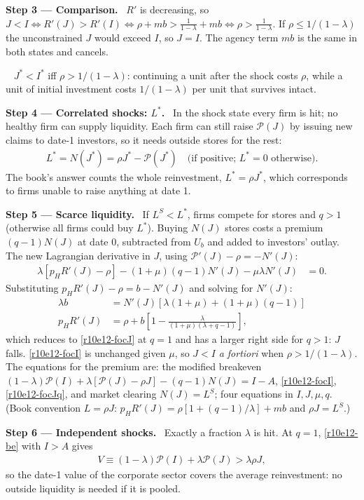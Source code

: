 \documentclass[11pt,a4paper]{article}
\newcommand{\step}[2]{\par\medskip\noindent\textbf{Step #1 --- #2.}~}
\newcommand{\answer}[1]{\par\smallskip\noindent\fbox{\textbf{Answer\if\relax\detokenize{#1}\relax\else\ #1\fi.}}~}
\newcommand{\Pc}{\mathcal{P}}
\begin{document}
\step{3}{Comparison} $R'$ is decreasing, so $J<I\iff R'(J)>R'(I)\iff\rho+mb>\frac1{1-\lambda}+mb\iff\rho>\frac1{1-\lambda}$. If $\rho\leq1/(1-\lambda)$ the unconstrained $J$ would exceed $I$, so $J=I$. The agency term $mb$ is the same in both states and cancels.

\answer{(i)} $J^*<I^*$ iff $\rho>1/(1-\lambda)$: continuing a unit after the shock costs $\rho$, while a unit of initial investment costs $1/(1-\lambda)$ per unit that survives intact.

\step{4}{Correlated shocks: $L^*$} In the shock state every firm is hit; no healthy firm can supply liquidity. Each firm can still raise $\Pc(J)$ by issuing new claims to date-1 investors, so it needs outside stores for the rest:
\begin{align}
  L^* = N(J^*) = \rho J^*-\Pc(J^*) \quad\text{(if positive; } L^*=0 \text{ otherwise)}. \label{r10e12-L}
\end{align}
The book's answer counts the whole reinvestment, $L^*=\rho J^*$, which corresponds to firms unable to raise anything at date 1.

\step{5}{Scarce liquidity} If $L^S<L^*$, firms compete for stores and $q>1$ (otherwise all firms could buy $L^*$). Buying $N(J)$ stores costs a premium $(q-1)N(J)$ at date 0, subtracted from $U_b$ and added to investors' outlay. The new Lagrangian derivative in $J$, using $\Pc'(J)-\rho=-N'(J)$:
\begin{align}
  \lambda[p_HR'(J)-\rho]-(1+\mu)(q-1)N'(J)-\mu\lambda N'(J) &= 0. \nonumber
\end{align}
Substituting $p_HR'(J)-\rho=b-N'(J)$ and solving for $N'(J)$:
\begin{align}
  \lambda b &= N'(J)[\lambda(1+\mu)+(1+\mu)(q-1)] \nonumber\\
  p_HR'(J) &= \rho+b\left[1-\frac{\lambda}{(1+\mu)(\lambda+q-1)}\right], \tag{4$''$}\label{r10e12-focJq}
\end{align}
which reduces to \eqref{r10e12-focJ} at $q=1$ and has a larger right side for $q>1$: $J$ falls. \eqref{r10e12-focI} is unchanged given $\mu$, so $J<I$ \emph{a fortiori} when $\rho>1/(1-\lambda)$. The equations for the premium are: the modified breakeven $(1-\lambda)\Pc(I)+\lambda[\Pc(J)-\rho J]-(q-1)N(J)=I-A$, \eqref{r10e12-focI}, \eqref{r10e12-focJq}, and market clearing $N(J)=L^S$; four equations in $I,J,\mu,q$. (Book convention $L=\rho J$: $p_HR'(J)=\rho[1+(q-1)/\lambda]+mb$ and $\rho J=L^S$.)

\step{6}{Independent shocks} Exactly a fraction $\lambda$ is hit. At $q=1$, \eqref{r10e12-be} with $I>A$ gives
\begin{align}
  V\equiv(1-\lambda)\Pc(I)+\lambda\Pc(J) > \lambda\rho J, \label{r10e12-V}
\end{align}
so the date-1 value of the corporate sector covers the average reinvestment: no outside liquidity is needed if it is pooled.
\end{document}
